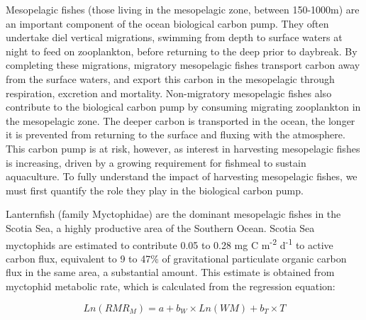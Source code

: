 \documentclass[12pt, titlepage]{article}
\begin{document}
Mesopelagic fishes (those living in the mesopelagic zone, between 150-1000m) are an important component of the ocean biological carbon pump. %
They often undertake diel vertical migrations, swimming from depth to surface waters at night to feed on zooplankton, before returning to the deep prior to daybreak. %
By completing these migrations, migratory mesopelagic fishes transport carbon away from the surface waters, and export this carbon in the mesopelagic through respiration, excretion and mortality. 
Non-migratory mesopelagic fishes also contribute to the biological carbon pump by consuming migrating zooplankton in the mesopelagic zone. %
The deeper carbon is transported in the ocean, the longer it is prevented from returning to the surface and fluxing with the atmosphere. %
This carbon pump is at risk, however, as interest in harvesting mesopelagic fishes is increasing, driven by a growing requirement for fishmeal to sustain aquaculture. %
To fully understand the impact of harvesting mesopelagic fishes, we must first quantify the role they play in the biological carbon pump.

Lanternfish (family Myctophidae) are the dominant mesopelagic fishes in the Scotia Sea, a highly productive area of the Southern Ocean. %
Scotia Sea myctophids are estimated to contribute 0.05 to 0.28 mg C m\textsuperscript{-2} d\textsuperscript{-1} to active carbon flux, equivalent to 9 to 47\% of gravitational particulate organic carbon flux in the same area, a substantial amount. %
This estimate is obtained from myctophid metabolic rate, which is calculated from the regression equation:

\begin{equation}
Ln(RMR_{M}) = a + b_{W} \times Ln(WM) + b_{T} \times T
\end{equation}
\end{document}
